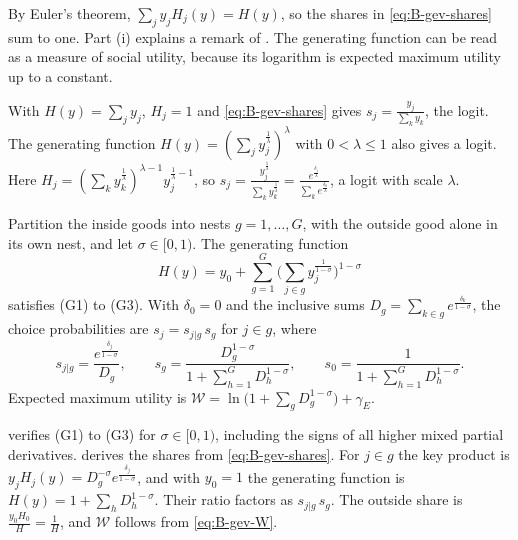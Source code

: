 By Euler's theorem, $\sum_jy_jH_j(y) = H(y)$, so the shares in \eqref{eq:B-gev-shares} sum to one. Part (i)
explains a remark of \citet[p.~1425]{McFadden1984}. The generating function can be read as a measure of social
utility, because its logarithm is expected maximum utility up to a constant.

\begin{example}\label{ex:B-gev-logit}
With $H(y) = \sum_jy_j$, $H_j = 1$ and \eqref{eq:B-gev-shares} gives $s_j = \frac{y_j}{\sum_ky_k}$, the logit. The
generating function $H(y) = \left(\sum_jy_j^{\frac{1}{\lambda}}\right)^\lambda$ with $0 < \lambda \leq 1$
\citep[eq.~3.32]{McFadden1984} also gives a logit. Here
$H_j = \left(\sum_ky_k^{\frac{1}{\lambda}}\right)^{\lambda - 1}y_j^{\frac{1}{\lambda} - 1}$, so
$s_j = \frac{y_j^{\frac{1}{\lambda}}}{\sum_ky_k^{\frac{1}{\lambda}}} = \frac{e^{\frac{\delta_j}{\lambda}}}{\sum_ke^{\frac{\delta_k}{\lambda}}}$, a logit with
scale $\lambda$.
\end{example}

\begin{proposition}\label{prop:B-nested}
Partition the inside goods into nests $g = 1, \dots, G$, with the outside good alone in its own nest, and let
$\sigma \in [0, 1)$. The generating function
\begin{equation}\label{eq:B-nested-H}
H(y) = y_0 + \sum_{g = 1}^G\Big(\sum_{j \in g}y_j^{\frac{1}{1 - \sigma}}\Big)^{1 - \sigma}
\end{equation}
satisfies (G1) to (G3). With $\delta_0 = 0$ and the inclusive sums $D_g = \sum_{k \in g}e^{\frac{\delta_k}{1 - \sigma}}$, the
choice probabilities are $s_j = s_{j|g}\,s_g$ for $j \in g$, where
\begin{equation}\label{eq:B-nested-shares}
s_{j|g} = \frac{e^{\frac{\delta_j}{1 - \sigma}}}{D_g},
\qquad
s_g = \frac{D_g^{1 - \sigma}}{1 + \sum_{h = 1}^GD_h^{1 - \sigma}},
\qquad
s_0 = \frac{1}{1 + \sum_{h = 1}^GD_h^{1 - \sigma}} .
\end{equation}
Expected maximum utility is $\mathcal{W} = \ln\big(1 + \sum_gD_g^{1 - \sigma}\big) + \gamma_E$.
\end{proposition}

 verifies (G1) to (G3) for $\sigma \in [0, 1)$, including the signs of all higher mixed
partial derivatives.  derives the shares from \eqref{eq:B-gev-shares}. For $j \in g$ the
key product is $y_jH_j(y) = D_g^{-\sigma}e^{\frac{\delta_j}{1 - \sigma}}$, and with $y_0 = 1$ the generating function
is $H(y) = 1 + \sum_hD_h^{1 - \sigma}$. Their ratio factors as $s_{j|g}\,s_g$. The outside share is
$\frac{y_0H_0}{H} = \frac{1}{H}$, and $\mathcal{W}$ follows from \eqref{eq:B-gev-W}.

